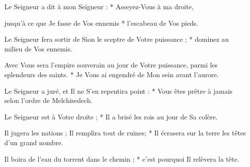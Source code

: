 \item Le Seigneur a dit à mon Seigneur : * Asseyez-Vous à ma droite,
\item jusqu'à ce que Je fasse de Vos ennemis * l'escabeau de Vos pieds.
\item Le Seigneur fera sortir de Sion le sceptre de Votre puissance ; * dominez au milieu de Vos ennemis.
\item Avec Vous sera l'empire souverain au jour de Votre puissance, parmi les splendeurs des saints. * Je Vous ai engendré de Mon sein avant l'aurore.
\item Le Seigneur a juré, et Il ne S'en repentira point : * Vous êtes prêtre à jamais selon l'ordre de Melchisedech.
\item Le Seigneur est à Votre droite ; * Il a brisé les rois au jour de Sa colère.
\item Il jugera les nations ; Il remplira tout de ruines; * Il écrasera sur la terre les têtes d'un grand nombre.
\item Il boira de l'eau du torrent dans le chemin ; * c'est pourquoi Il relèvera la tête.

